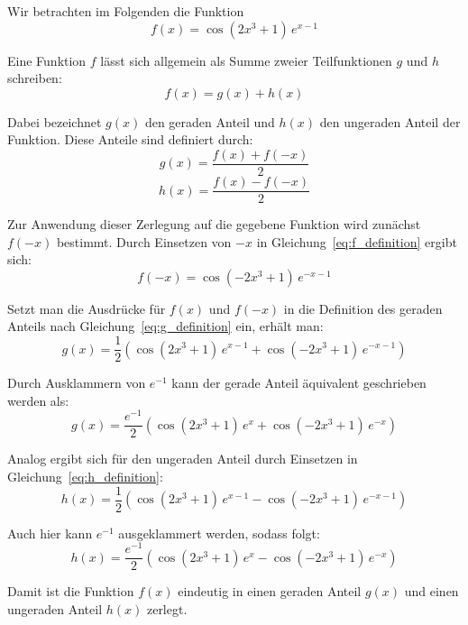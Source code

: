 
\noindent
Wir betrachten im Folgenden die Funktion
\begin{equation}
\label{eq:f_definition}
f(x) = \cos(2x^3 + 1)\,e^{x-1}
\end{equation}

\noindent
Eine Funktion $f$ lässt sich allgemein als Summe zweier Teilfunktionen $g$ und $h$
schreiben:
\begin{equation}
\label{eq:f_zerlegung}
f(x) = g(x) + h(x)
\end{equation}

\noindent
Dabei bezeichnet $g(x)$ den geraden Anteil und $h(x)$ den ungeraden Anteil der
Funktion. Diese Anteile sind definiert durch:
\begin{equation}
\label{eq:g_definition}
g(x) = \frac{f(x) + f(-x)}{2}
\end{equation}
\begin{equation}
\label{eq:h_definition}
h(x) = \frac{f(x) - f(-x)}{2}
\end{equation}

\noindent
Zur Anwendung dieser Zerlegung auf die gegebene Funktion wird zunächst $f(-x)$
bestimmt. Durch Einsetzen von $-x$ in Gleichung~\eqref{eq:f_definition} ergibt sich:
\begin{equation}
\label{eq:f_minus_x}
f(-x) = \cos(-2x^3 + 1)\,e^{-x-1}
\end{equation}

\noindent
Setzt man die Ausdrücke für $f(x)$ und $f(-x)$ in die Definition des geraden Anteils
nach Gleichung~\eqref{eq:g_definition} ein, erhält man:
\begin{equation}
\label{eq:g_result}
g(x) = \frac{1}{2}\left(\cos(2x^3+1)\,e^{x-1} + \cos(-2x^3+1)\,e^{-x-1}\right)
\end{equation}

\noindent
Durch Ausklammern von $e^{-1}$ kann der gerade Anteil äquivalent geschrieben werden
als:
\begin{equation}
\label{eq:g_result_factored}
g(x) = \frac{e^{-1}}{2}\left(\cos(2x^3+1)\,e^{x} + \cos(-2x^3+1)\,e^{-x}\right)
\end{equation}

\noindent
Analog ergibt sich für den ungeraden Anteil durch Einsetzen in Gleichung~\eqref{eq:h_definition}:
\begin{equation}
\label{eq:h_result}
h(x) = \frac{1}{2}\left(\cos(2x^3+1)\,e^{x-1} - \cos(-2x^3+1)\,e^{-x-1}\right)
\end{equation}

\noindent
Auch hier kann $e^{-1}$ ausgeklammert werden, sodass folgt:
\begin{equation}
\label{eq:h_result_factored}
h(x) = \frac{e^{-1}}{2}\left(\cos(2x^3+1)\,e^{x} - \cos(-2x^3+1)\,e^{-x}\right)
\end{equation}

\noindent
Damit ist die Funktion $f(x)$ eindeutig in einen geraden Anteil $g(x)$ und einen
ungeraden Anteil $h(x)$ zerlegt.
